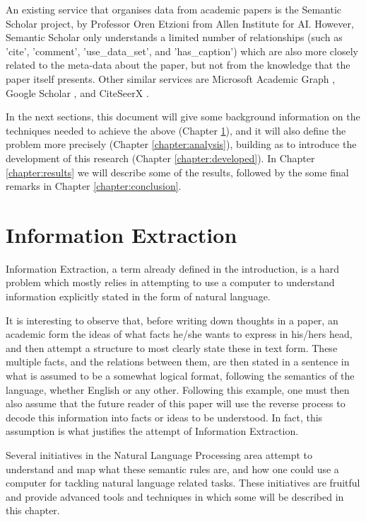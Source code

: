 \documentclass[11pt,a4paper,openright]{memoir}
\begin{document}
An existing service that organises data from academic papers is the Semantic Scholar \cite{semanticscholar} project, by Professor Oren Etzioni from Allen Institute for AI. However, Semantic Scholar only understands a limited number of relationships (such as 'cite', 'comment', 'use\_data\_set', and 'has\_caption') which are also more closely related to the meta-data about the paper, but not from the knowledge that the paper itself presents. Other similar services are Microsoft Academic Graph \cite{microsoft-academic-data}, Google Scholar \cite{google-scholar}, and CiteSeerX \cite{citeseer-x}.

In the next sections, this document will give some background information on the techniques needed to achieve the above (Chapter \ref{chapter:information}), and it will also define the problem more precisely (Chapter \ref{chapter:analysis}), building as to introduce the development of this research (Chapter \ref{chapter:developed}). In Chapter \ref{chapter:results} we will describe some of the results, followed by the some final remarks in Chapter \ref{chapter:conclusion}.


%
%
%
%


\chapter{Information Extraction}
\label{chapter:information}

Information Extraction, a term already defined in the introduction, is a hard problem which mostly relies in attempting to use a computer to understand information explicitly stated in the form of natural language.

It is interesting to observe that, before writing down thoughts in a paper, an academic form the ideas of what facts he/she wants to express in his/hers head, and then attempt a structure to most clearly state these in text form. These multiple facts, and the relations between them, are then stated in a sentence in what is assumed to be a somewhat logical format, following the semantics of the language, whether English or any other. Following this example, one must then also assume that the future reader of this paper will use the reverse process to decode this information into facts or ideas to be understood. In fact, this assumption is what justifies the attempt of Information Extraction.

Several initiatives in the Natural Language Processing area attempt to understand and map what these semantic rules are, and how one could use a computer for tackling natural language related tasks. These initiatives are fruitful and provide advanced tools and techniques in which some will be described in this chapter.
\end{document}

